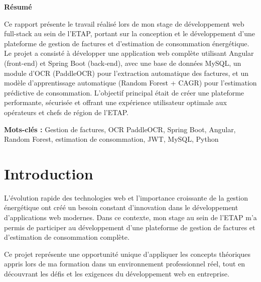 \documentclass[12pt,a4paper]{article}
\begin{document}
\begin{center}
\vspace*{3cm}

{\Huge\bfseries Résumé\par}

\vspace{2cm}

\begin{minipage}{0.8\textwidth}
Ce rapport présente le travail réalisé lors de mon stage de développement web full-stack au sein de l'ETAP, portant sur la conception et le développement d'une plateforme de gestion de factures et d'estimation de consommation énergétique. Le projet a consisté à développer une application web complète utilisant Angular (front-end) et Spring Boot (back-end), avec une base de données MySQL, un module d'OCR (PaddleOCR) pour l'extraction automatique des factures, et un modèle d'apprentissage automatique (Random Forest + CAGR) pour l'estimation prédictive de consommation. L'objectif principal était de créer une plateforme performante, sécurisée et offrant une expérience utilisateur optimale aux opérateurs et chefs de région de l'ETAP.

\vspace{1cm}

\textbf{Mots-clés :} Gestion de factures, OCR PaddleOCR, Spring Boot, Angular, Random Forest, estimation de consommation, JWT, MySQL, Python
\end{minipage}
\end{center}

\newpage

\tableofcontents
\newpage

\section{Introduction}
L'évolution rapide des technologies web et l'importance croissante de la gestion énergétique ont créé un besoin constant d'innovation dans le développement d'applications web modernes. Dans ce contexte, mon stage au sein de l'ETAP m'a permis de participer au développement d'une plateforme de gestion de factures et d'estimation de consommation complète.

Ce projet représente une opportunité unique d'appliquer les concepts théoriques appris lors de ma formation dans un environnement professionnel réel, tout en découvrant les défis et les exigences du développement web en entreprise.
\end{document}
